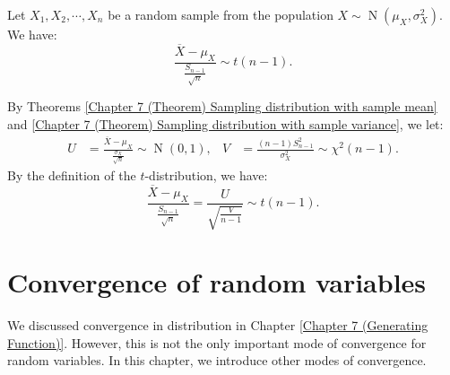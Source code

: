 \documentclass{huhtakm-template-book-v2}
\DeclareMathOperator{\N}{N}
\begin{document}
    \begin{thm}
        Let $X_{1},X_{2},\cdots,X_{n}$ be a random sample from the population $X \sim \N(\mu_{X},\sigma_{X}^{2})$. We have:
        \begin{equation*}
            \frac{\overline{X}-\mu_{X}}{\frac{S_{n-1}}{\sqrt{n}}} \sim t(n-1).
        \end{equation*}
    \end{thm}
    \begin{proofing}
        By Theorems \ref{Chapter 7 (Theorem) Sampling distribution with sample mean} and \ref{Chapter 7 (Theorem) Sampling distribution with sample variance}, we let:
        \begin{align*}
            U &= \frac{\overline{X}-\mu_{X}}{\frac{\sigma_{X}}{\sqrt{n}}} \sim \N(0,1), & V &= \frac{(n-1)S_{n-1}^{2}}{\sigma_{X}^{2}} \sim \chi^{2}(n-1).
        \end{align*}
        By the definition of the $t$-distribution, we have:
        \begin{equation*}
            \frac{\overline{X}-\mu_{X}}{\frac{S_{n-1}}{\sqrt{n}}} = \frac{U}{\sqrt{\frac{V}{n-1}}} \sim t(n-1).
        \end{equation*}
    \end{proofing}

\chapter{Convergence of random variables}
    \label{Chapter 8 (Convergence of random variables)}
    We discussed convergence in distribution in Chapter \ref{Chapter 7 (Generating Function)}. However, this is not the only important mode of convergence for random variables. In this chapter, we introduce other modes of convergence.
\end{document}
